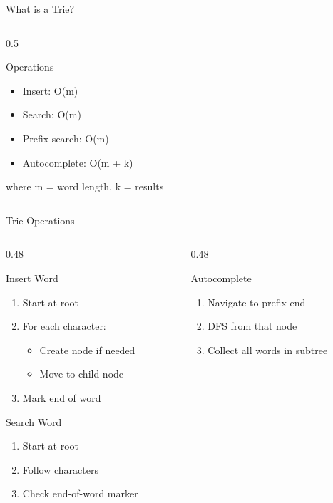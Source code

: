 \documentclass[aspectratio=169,xcolor=dvipsnames]{beamer}
\begin{document}
\begin{frame}{What is a Trie?}
\begin{columns}
\begin{column}{0.5\textwidth}
      \begin{exampleblock}{Operations}
        \begin{itemize}
          \item Insert: O(m)
          \item Search: O(m)
          \item Prefix search: O(m)
          \item Autocomplete: O(m + k)
        \end{itemize}
        where m = word length, k = results
      \end{exampleblock}
    \end{column}
  \end{columns}
\end{frame}

\begin{frame}{Trie Operations}
  \begin{columns}
    \begin{column}{0.48\textwidth}
      \begin{block}{Insert Word}
        \begin{enumerate}
          \item Start at root
          \item For each character:
          \begin{itemize}
            \item Create node if needed
            \item Move to child node
          \end{itemize}
          \item Mark end of word
        \end{enumerate}
      \end{block}

      \begin{block}{Search Word}
        \begin{enumerate}
          \item Start at root
          \item Follow characters
          \item Check end-of-word marker
        \end{enumerate}
      \end{block}
    \end{column}
    \begin{column}{0.48\textwidth}
      \begin{block}{Autocomplete}
        \begin{enumerate}
          \item Navigate to prefix end
          \item DFS from that node
          \item Collect all words in subtree
        \end{enumerate}
      \end{block}


\end{column}
\end{columns}
\end{frame}
\end{document}

